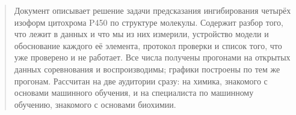 

\maketitle
\thispagestyle{empty}
\begin{abstract}
\noindent
Документ описывает решение задачи предсказания ингибирования четырёх изоформ цитохрома P450 по структуре
молекулы. Содержит разбор того, что лежит в данных и что мы из них измерили, устройство модели и обоснование
каждого её элемента, протокол проверки и список того, что уже проверено и не работает. Все числа получены
прогонами на открытых данных соревнования и воспроизводимы; графики построены по тем же прогонам.
Рассчитан на две аудитории сразу: на химика, знакомого с основами машинного обучения, и на специалиста
по машинному обучению, знакомого с основами биохимии.
\end{abstract}
\vspace{4mm}
{\small\tableofcontents}
\clearpage
















